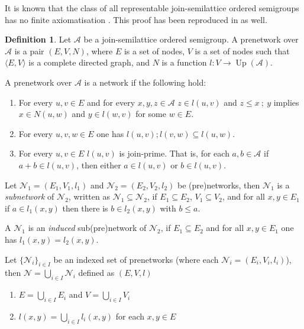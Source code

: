 \documentclass[a4paper]{article}
\theoremstyle{definition}
\newtheorem{definition}{Definition}
\theoremstyle{theorem}
\theoremstyle{proposition}
\theoremstyle{lemma}
\theoremstyle{ex}
\theoremstyle{corollary}
\theoremstyle{claim}
\begin{document}
It is known that the class of all representable join-semilattice ordered semigroups has no finite axiomatisation \cite{andreka1989union}. This proof has been reproduced in \cite{andreka2011axiomatizability} as well.

\begin{definition} Let $\mathcal{A}$ be a join-semilattice ordered semigroup. A prenetwork over $\mathcal{A}$ is a pair $(E, V, N)$, where $E$ is a set of nodes, $V$ is a set of nodes such that $\langle E, V \rangle$ is a complete directed graph, and $N$ is a function $l : V \to \operatorname{Up}(\mathcal{A})$.

  A prenetwork over $\mathcal{A}$ is a network if the following hold:
  \begin{enumerate}
    \item For every $u, v \in E$ and for every $x,y,z \in \mathcal{A}$ $z \in l(u, v)$ and $z \leq x \: ; \: y$ implies $x \in N(u, w)$ and $y \in l(w, v)$ for some $w \in E$.
    \item For every $u, v, w \in E$ one has $l(u, v) ; l(v, w) \subseteq l(u, w)$.
    \item For every $u, v \in E$ $l(u,v)$ is join-prime. That is, for each $a, b \in \mathcal{A}$ if $a + b \in l(u,v)$, then either $a \in l(u,v)$ or $b \in l(u,v)$.
  \end{enumerate}
\end{definition}

Let $\mathcal{N}_1 = (E_1, V_1, l_1)$ and $\mathcal{N}_2 = (E_2, V_2, l_2)$ be (pre)networks, then $\mathcal{N}_1$ is a \emph{subnetwork} of $\mathcal{N}_2$, written as $\mathcal{N}_1 \subseteq \mathcal{N}_2$,
if $E_1 \subseteq E_2$, $V_1 \subseteq V_2$, and for all $x, y \in E_1$ if $a \in l_1(x, y)$ then there is $b \in l_2(x, y)$ with $b \leq a$.

A $\mathcal{N}_1$ is an \emph{induced} sub(pre)network of $\mathcal{N}_2$, if $E_1 \subseteq E_2$ and for all $x, y \in E_1$ one has $l_1(x,y) = l_2(x,y)$.

Let $\{ \mathcal{N}_i \}_{i \in I}$ be an indexed set of prenetworks (where each $\mathcal{N}_i = (E_i, V_i, l_i)$), then $\mathcal{N} = \bigcup \limits_{i \in I} \mathcal{N}_i$ defined as $(E, V, l)$

\begin{enumerate}
  \item $E = \bigcup \limits_{i \in I} E_i$ and $V = \bigcup \limits_{i \in I} V_i$
  \item $l(x, y) = \bigcup \limits_{ i \in I } l_i(x, y)$ for each $x, y \in E$
\end{enumerate}
\end{document}
